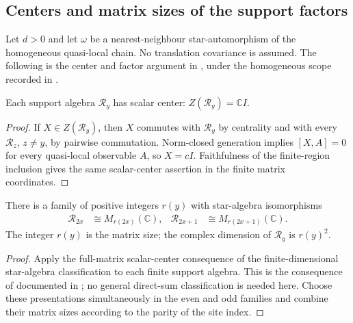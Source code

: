 \subsection{Centers and matrix sizes of the support factors}
\label{sec:qca_support_factors}

Let $d>0$ and let $\omega$ be a nearest-neighbour star-automorphism of the
homogeneous quasi-local chain. No translation covariance is assumed.
The following is the center and factor argument in
\cite[lines~1276--1282]{Gross2012IndexTheory}, under the homogeneous scope
recorded in \cite{gap:gnvw12_site_dependent_adjacent_generation_scope}.

\begin{lemma}
    \label{lem:qca_support_factor_centers}
    \leanok
    Each support algebra $\mathcal R_y$ has scalar center:
    $Z(\mathcal R_y)=\mathbb C I$.
\end{lemma}
\begin{proof}\leanok
    If $X\in Z(\mathcal R_y)$, then $X$ commutes with $\mathcal R_y$ by
    centrality and with every $\mathcal R_z$, $z\ne y$, by pairwise
    commutation. Norm-closed generation implies $[X,A]=0$ for every
    quasi-local observable $A$, so $X=cI$. Faithfulness of the finite-region
    inclusion gives the same scalar-center assertion in the finite matrix
    coordinates.
\end{proof}

\begin{lemma}
    \label{lem:qca_support_factor_presentations}
    \leanok
    There is a family of positive integers $r(y)$ with star-algebra
    isomorphisms
    \begin{align}
        \mathcal R_{2x}   & \cong M_{r(2x)}(\mathbb C),   &
        \mathcal R_{2x+1} & \cong M_{r(2x+1)}(\mathbb C).
        \label{eq:qca_support_factor_presentations}
    \end{align}
    The integer $r(y)$ is the matrix size; the complex dimension of
    $\mathcal R_y$ is $r(y)^2$.
\end{lemma}
\begin{proof}\leanok
    Apply the full-matrix scalar-center consequence of the finite-dimensional
    star-algebra classification to each finite support algebra. This is the
    consequence of \cite[Proposition~Csform]{SchumacherWerner2004QCA}
    documented in \cite{gap:sw04_csform_matrix_scope}; no general direct-sum
    classification is needed here. Choose these presentations simultaneously
    in the even and odd families and combine their matrix sizes according to
    the parity of the site index.
\end{proof}

